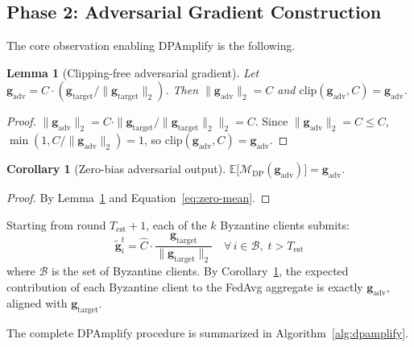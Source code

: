 \documentclass[conference]{IEEEtran}
\newtheorem{corollary}[theorem]{Corollary}
\newtheorem{lemma}[theorem]{Lemma}
\begin{document}
\subsection{Phase 2: Adversarial Gradient Construction}
\label{sec:attack-phase2}

The core observation enabling DPAmplify is the following.

\begin{lemma}[Clipping-free adversarial gradient]
\label{lem:no-clip}
Let $\mathbf{g}_{\mathrm{adv}}
= C \cdot (\mathbf{g}_{\mathrm{target}} /
\|\mathbf{g}_{\mathrm{target}}\|_2)$.
Then $\|\mathbf{g}_{\mathrm{adv}}\|_2 = C$ and
$\mathrm{clip}(\mathbf{g}_{\mathrm{adv}}, C)
= \mathbf{g}_{\mathrm{adv}}$.
\end{lemma}
\begin{proof}
$\|\mathbf{g}_{\mathrm{adv}}\|_2
= C \cdot \|\mathbf{g}_{\mathrm{target}}
/ \|\mathbf{g}_{\mathrm{target}}\|_2\|_2 = C$.
Since $\|\mathbf{g}_{\mathrm{adv}}\|_2 = C \leq C$,
$\min(1, C/\|\mathbf{g}_{\mathrm{adv}}\|_2) = 1$,
so $\mathrm{clip}(\mathbf{g}_{\mathrm{adv}}, C)
= \mathbf{g}_{\mathrm{adv}}$.
\end{proof}

\begin{corollary}[Zero-bias adversarial output]
\label{cor:zero-bias}
$\mathbb{E}\bigl[\mathcal{M}_{\mathrm{DP}}
(\mathbf{g}_{\mathrm{adv}})\bigr]
= \mathbf{g}_{\mathrm{adv}}$.
\end{corollary}
\begin{proof}
By Lemma~\ref{lem:no-clip} and
Equation~\ref{eq:zero-mean}.
\end{proof}

Starting from round $T_{\mathrm{est}} + 1$, each of the
$k$ Byzantine clients submits:
\begin{equation}
    \tilde{\mathbf{g}}_i^t
    = \hat{C} \cdot
    \frac{\mathbf{g}_{\mathrm{target}}}
    {\|\mathbf{g}_{\mathrm{target}}\|_2}
    \quad \forall\, i \in \mathcal{B},\;
    t > T_{\mathrm{est}}
    \label{eq:g-adv}
\end{equation}
where $\mathcal{B}$ is the set of Byzantine clients.
By Corollary~\ref{cor:zero-bias}, the expected
contribution of each Byzantine client to the FedAvg
aggregate is exactly $\mathbf{g}_{\mathrm{adv}}$,
aligned with $\mathbf{g}_{\mathrm{target}}$.

The complete DPAmplify procedure is summarized in
Algorithm~\ref{alg:dpamplify}.
\end{document}
